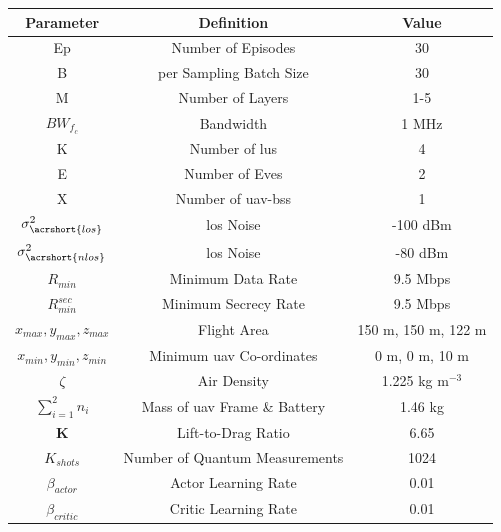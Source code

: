 \begin{table} [ht!]
    \centering
    \begin{tabular}{ | c | c | c | } 
         \hline
         \textbf{Parameter} & \textbf{Definition} & \textbf{Value} \\ [0.75ex] 
         \hline
         Ep & Number of Episodes & 30 \\ 
         \hline
         B & \acrshort{per} Sampling Batch Size & 30 \\
         \hline
         M & Number of Layers & 1-5 \\
         \hline
         $BW_{f_{c}}$ & Bandwidth & 1 MHz \\
         \hline
         K & Number of \acrshort{lu}s & 4 \\
         \hline
         E & Number of Eves & 2 \\  
         \hline
         X & Number of \acrshort{uav}-\acrshort{bs}s & 1 \\
         \hline
         $\sigma_{\acrshort{los}}^{2}$ & \acrshort{los} Noise & -100 dBm \\ 
         \hline
         $\sigma_{\acrshort{nlos}}^{2}$ & \acrshort{los} Noise & -80 dBm \\ 
         \hline
         $R_{min}$ & Minimum Data Rate & 9.5 Mbps \\
         \hline
         $R_{min}^{sec}$ & Minimum Secrecy Rate  & 9.5 Mbps \\
         \hline
         $x_{max}, y_{max}, z_{max}$ & Flight Area & 150 m, 150 m, 122 m \\ 
         \hline
         $x_{min}, y_{min}, z_{min}$ & Minimum \acrshort{uav} Co-ordinates & 0 m, 0 m, 10 m \\ 
         \hline
         $\zeta$ & Air Density & 1.225 kg m$^{-3}$ \\
         \hline
         $\sum_{i=1}^{2} n_{i}$ & Mass of \acrshort{uav} Frame \& Battery & 1.46 kg \\ 
         \hline
         $\textbf{K}$ & Lift-to-Drag Ratio & 6.65 \\ 
         \hline
         $K_{shots}$ & Number of Quantum Measurements & 1024 \\
         \hline
         $\beta_{actor}$ & Actor Learning Rate & 0.01 \\
         \hline
         $\beta_{critic}$ & Critic Learning Rate & 0.01 \\

\end{tabular}
\end{table}
